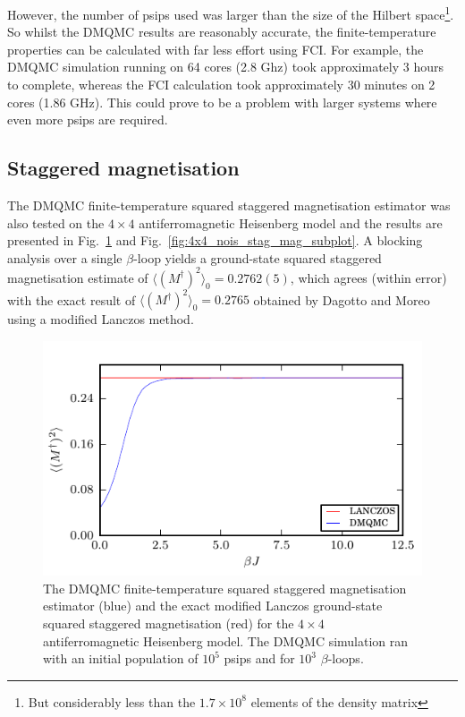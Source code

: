 However, the number of psips used was larger than the size of the Hilbert space\footnote{But considerably less than the $1.7\times10^8$ elements of the density matrix}. So whilst the DMQMC results are reasonably accurate, the finite-temperature properties can be calculated with far less effort using FCI. For example, the DMQMC simulation running on 64 cores (2.8 Ghz) took approximately 3 hours to complete, whereas the FCI calculation took approximately 30 minutes on 2 cores (1.86 GHz). This could prove to be a problem with larger systems where even more psips are required.

\subsection{Staggered magnetisation}
The DMQMC finite-temperature squared staggered magnetisation estimator was also tested on the $4\times4$ antiferromagnetic Heisenberg model and the results are presented in Fig.~\ref{fig:4x4_nois_stag_mag} and  Fig.~\ref{fig:4x4_nois_stag_mag_subplot}. A blocking analysis over a single $\beta$-loop yields a ground-state squared staggered magnetisation estimate of $\langle (M^{\dagger})^2\rangle_0 = 0.2762(5)$, which agrees (within error) with the exact result of $\langle (M^{\dagger})^2\rangle_0 = 0.2765$ obtained by Dagotto and Moreo\cite{Dagotto1988} using a modified Lanczos method.
\begin{figure}[H]
\begin{center}
\includegraphics[width =1\textwidth]{4x4_nois_stag_mag.pdf}
\caption[The DMQMC finite-temperature squared staggered magnetisation estimator for the $4\times4$ antiferromagnetic Heisenberg model.]{The DMQMC finite-temperature squared staggered magnetisation estimator (blue) and the exact modified Lanczos ground-state squared staggered magnetisation (red) for the $4\times4$ antiferromagnetic Heisenberg model. The DMQMC simulation ran with an initial population of $10^5$ psips and for $10^3$ $\beta$-loops.}
\label{fig:4x4_nois_stag_mag}
\end{center}
\end{figure}
